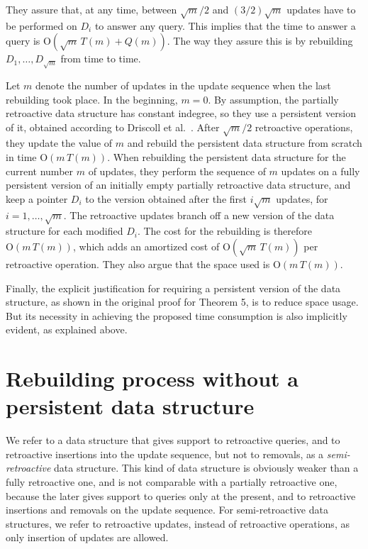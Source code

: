 \documentclass[reqno,11pt]{amsart}
\newcommand{\Oh}{\mathrm{O}}
\begin{document}
They assure that, at any time, between $\sqrt{m}/2$ and $(3/2)\sqrt{m}$ 
updates have to be performed on $D_i$ to answer any query.  
This implies that the time to answer a query is $\Oh(\sqrt{m}\,T(m)+Q(m))$.  
The way they assure this is by rebuilding $D_1,\ldots,D_{\sqrt{m}}$ from time to time. 

Let $m$ denote the number of updates in the update sequence when the last rebuilding took place.
In the beginning, $m=0$. 
By assumption, the partially retroactive data structure has constant indegree, so they use 
a persistent version of it, obtained according to Driscoll et al.~\cite{DriscollSST1989}.
After $\sqrt{m}/2$ retroactive operations, they update the value of $m$ and 
rebuild the persistent data structure from scratch in time $\Oh(m\,T(m))$. 
When rebuilding the persistent data structure for the current number $m$ of updates, 
they perform the sequence of $m$ updates on a fully persistent version of an 
initially empty partially retroactive data structure, and keep a pointer $D_i$ 
to the version obtained after the first $i\sqrt{m}$ updates, for $i = 1,\ldots,\sqrt{m}$. 
The retroactive updates branch off 
a new version of the data structure for each modified $D_i$.  
The cost for the rebuilding is therefore $\Oh(m\,T(m))$, 
which adds an amortized cost of $\Oh(\sqrt{m}\,T(m))$ per retroactive operation. 
They also argue that the space used is $\Oh(m\,T(m))$.

Finally, the explicit justification for requiring a persistent version of the data structure, 
as shown in the original proof for Theorem 5, is to reduce space usage. But its necessity in 
achieving the proposed time consumption is also implicitly evident, as explained above.

\section{Rebuilding process without a persistent data structure}\label{sec:rebuilding}

We refer to a data structure that gives support to retroactive queries, 
and to retroactive insertions into the update sequence, but not to removals, 
as a \emph{semi-retroactive} data structure.
This kind of data structure is obviously weaker than a fully retroactive one, and
is not comparable with a partially retroactive one, because the later gives support 
to queries only at the present, and to retroactive insertions and removals on the 
update sequence.  For semi-retroactive data structures, we refer to retroactive 
updates, instead of retroactive operations, as only insertion of updates are allowed. 
\end{document}

